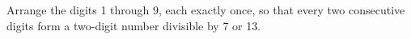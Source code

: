 Arrange the digits 1 through 9, each exactly once, so that every two consecutive digits form a two-digit number divisible by 7 or 13.
